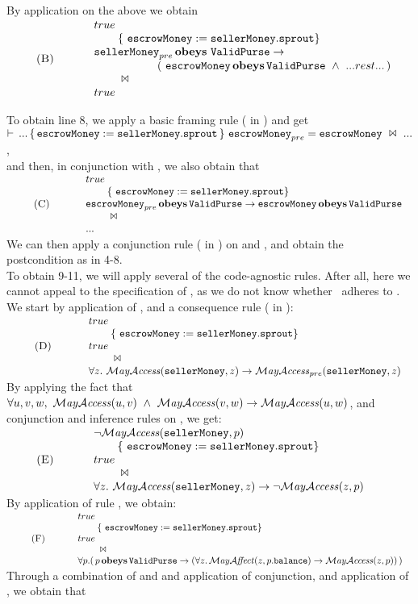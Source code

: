 \noindent
By application    on the above we obtain\\
$  
 \HoareNLSP {B}
      {\true}
       {\eM:=\sM.\sprout}
      { \sM\pre \obeys\, \PS \rightarrow \ \\
      \HoareSP\SP\SP (\ \eM  \obeys \PS\  \wedge \ ... rest ...\, )}
       { \true }  $

\noindent
To obtain line 8, we apply a basic framing rule %
( in \cite{appendix}) and get\\ %
\SP $\Hoare {...}  {\eM:=\sM.\sprout} {\eM\pre=\eM} {...} $, \\ and
then, in conjunction with ,    we also obtain that\\ 
$\HoareNLSP {C} 
     {\true}  
     {\eM:=\sM.\sprout} 
     {\eM\pre\obeys\PS \rightarrow \eM\obeys\PS} 
     {...}
$ \\
We can then apply a conjunction rule ( in \cite{appendix}) on  and  , and obtain the postcondition as in 4-8.\\
To obtain 9-11, we will apply several of the code-agnostic rules. After all, here we cannot appeal to the specification of \sprout, as we do not
know whether \sM\ adheres to \PS. We start by application of , and a consequence rule ( in \cite{appendix}):\\
$\HoareNLSP {D} 
     {\true}  
     {\eM:=\sM.\sprout} 
     {\true} 
     {\forall z. \ \MayAccess(\sM,z) \rightarrow \MayAccess\pre(\sM,z) }
$ \\
By applying  the fact that $\forall u,v,w,\ \MayAccess(u,v)\ \wedge\ \MayAccess(v,w) \rightarrow \MayAccess(u,w)$, and conjunction  and inference rules on , we get:\\
$\HoareNLSP {E} 
     {\neg \MayAccess(\sM,p)}  
     {\eM:=\sM.\sprout} 
     {\true} 
     {\forall z. \ \MayAccess(\sM,z) \rightarrow \neg \MayAccess(z,p) }
$ \\
By application of rule  , we obtain:\\
$\HoareNLSP {F} 
     {\true}  
     {\eM:=\sM.\sprout} 
     {\true} 
     {\forall p. (\, p\obeys\PS \rightarrow (\forall z. \, \MayAffect(z,p.\bal) \rightarrow \MayAccess(z,p)) \, )}
$ \\
Through a combination of  and  and application of conjunction, and application of , we obtain that\\

